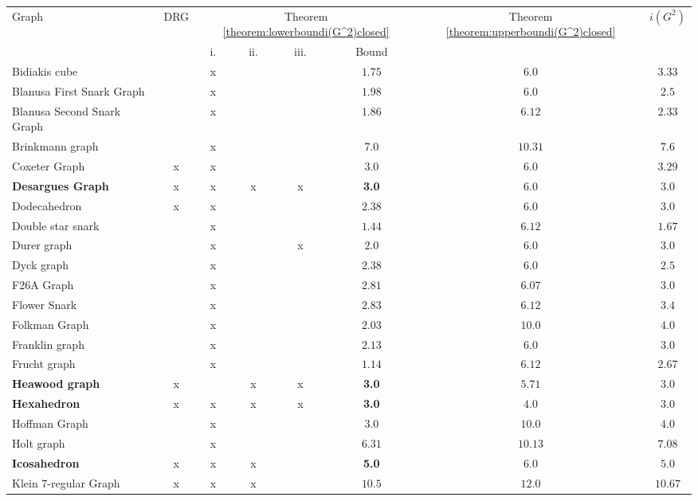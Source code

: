 \documentclass[a4paper,11pt]{article}
\theoremstyle{definition}
\begin{document}
 
\begin{table}[H]
    \centering
    \begin{tabular}{l|c|ccc|c|c|c}
    Graph & DRG & \multicolumn{4}{c|}{Theorem \ref{theorem:lowerboundi(G^2)closed}} & Theorem \ref{theorem:upperboundi(G^2)closed} & $i(G^2)$ \\
     &  & i. &ii. &  iii. & Bound &  &  \\
    \hline
    Bidiakis cube &  & x &  &  & $1.75$ & $6.0$ & $3.33$ \\
    Blanusa First Snark Graph &  & x &  &  & $1.98$ & $6.0$ & $2.5$ \\
    Blanusa Second Snark Graph &  & x &  &  & $1.86$ & $6.12$ & $2.33$ \\
    Brinkmann graph &  & x &  &  & $7.0$ & $10.31$ & $7.6$ \\
    Coxeter Graph & x & x &  &  & $3.0$ & $6.0$ & $3.29$ \\
    \textbf{Desargues Graph} & x & x & x & x & \textbf{3.0} & $6.0$ & $3.0$ \\
    Dodecahedron & x & x &  &  & $2.38$ & $6.0$ & $3.0$ \\
    Double star snark &  & x &  &  & $1.44$ & $6.12$ & $1.67$ \\
    Durer graph &  & x &  & x & $2.0$ & $6.0$ & $3.0$ \\
    Dyck graph &  & x &  &  & $2.38$ & $6.0$ & $2.5$ \\
    F26A Graph &  & x &  &  & $2.81$ & $6.07$ & $3.0$ \\
    Flower Snark &  & x &  &  & $2.83$ & $6.12$ & $3.4$ \\
    Folkman Graph &  & x &  &  & $2.03$ & $10.0$ & $4.0$ \\
    Franklin graph &  & x &  &  & $2.13$ & $6.0$ & $3.0$ \\
    Frucht graph &  & x &  &  & $1.14$ & $6.12$ & $2.67$ \\
    \textbf{Heawood graph} & x &  & x & x & \textbf{3.0} & $5.71$ & $3.0$ \\
    \textbf{Hexahedron} & x & x & x & x & \textbf{3.0} & $4.0$ & $3.0$ \\
    Hoffman Graph &  & x &  &  & $3.0$ & $10.0$ & $4.0$ \\
    Holt graph &  & x &  &  & $6.31$ & $10.13$ & $7.08$ \\
    \textbf{Icosahedron} & x & x & x &  & \textbf{5.0} & $6.0$ & $5.0$ \\
    Klein 7-regular Graph & x & x & x &  & $10.5$ & $12.0$ & $10.67$ \\

\end{tabular}
\end{table}
\end{document}
